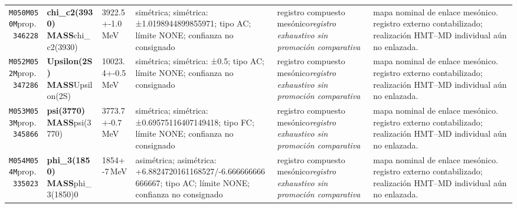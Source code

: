 \begin{landscape}
\begin{longtable}{L{1.85cm}L{4.45cm}L{2.35cm}L{4.05cm}L{3.35cm}L{7.15cm}}
\texttt{M050}\newline \texttt{M050M}\newline prop.\ \texttt{346228} & \textbf{chi\_\allowbreak{}c2(3930) MASS}\newline chi\_\allowbreak{}c2(3930) & 3922.5+-1.0\,MeV & simétrica; simétrica: ±1.0198944899855971; tipo AC; límite NONE; confianza no consignado & registro compuesto mesónico\newline \emph{registro exhaustivo sin promoción comparativa} & mapa nominal de enlace mesónico. registro externo contabilizado; realización HMT--MD individual aún no enlazada. \\
\texttt{M052}\newline \texttt{M052M}\newline prop.\ \texttt{347286} & \textbf{Upsilon(2S) MASS}\newline Upsilon(2S) & 10023.4+-0.5\,MeV & simétrica; simétrica: ±0.5; tipo AC; límite NONE; confianza no consignado & registro compuesto mesónico\newline \emph{registro exhaustivo sin promoción comparativa} & mapa nominal de enlace mesónico. registro externo contabilizado; realización HMT--MD individual aún no enlazada. \\
\texttt{M053}\newline \texttt{M053M}\newline prop.\ \texttt{345866} & \textbf{psi(3770) MASS}\newline psi(3770) & 3773.7+-0.7\,MeV & simétrica; simétrica: ±0.69575116407149418; tipo FC; límite NONE; confianza no consignado & registro compuesto mesónico\newline \emph{registro exhaustivo sin promoción comparativa} & mapa nominal de enlace mesónico. registro externo contabilizado; realización HMT--MD individual aún no enlazada. \\
\texttt{M054}\newline \texttt{M054M}\newline prop.\ \texttt{335023} & \textbf{phi\_\allowbreak{}3(1850) MASS}\newline phi\_\allowbreak{}3(1850)0 & 1854+-7\,MeV & asimétrica; asimétrica: +6.8824720161168527/-6.666666666666667; tipo AC; límite NONE; confianza no consignado & registro compuesto mesónico\newline \emph{registro exhaustivo sin promoción comparativa} & mapa nominal de enlace mesónico. registro externo contabilizado; realización HMT--MD individual aún no enlazada. \\

\end{longtable}
\end{landscape}
